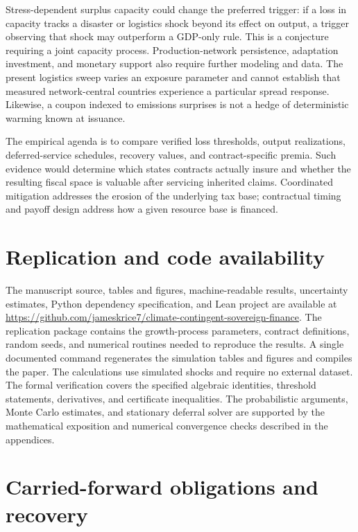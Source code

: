 \documentclass[11pt]{article}
\begin{document}
Stress-dependent surplus capacity could change the preferred trigger: if a loss in capacity tracks a disaster or logistics shock beyond its effect on output, a trigger observing that shock may outperform a GDP-only rule. This is a conjecture requiring a joint capacity process. Production-network persistence, adaptation investment, and monetary support also require further modeling and data. The present logistics sweep varies an exposure parameter and cannot establish that measured network-central countries experience a particular spread response. Likewise, a coupon indexed to emissions surprises is not a hedge of deterministic warming known at issuance.

The empirical agenda is to compare verified loss thresholds, output realizations, deferred-service schedules, recovery values, and contract-specific premia. Such evidence would determine which states contracts actually insure and whether the resulting fiscal space is valuable after servicing inherited claims. Coordinated mitigation addresses the erosion of the underlying tax base; contractual timing and payoff design address how a given resource base is financed.



\section*{Replication and code availability}
The manuscript source, tables and figures, machine-readable results, uncertainty estimates, Python dependency specification, and Lean project are available at \url{https://github.com/jameskrice7/climate-contingent-sovereign-finance}. The replication package contains the growth-process parameters, contract definitions, random seeds, and numerical routines needed to reproduce the results. A single documented command regenerates the simulation tables and figures and compiles the paper. The calculations use simulated shocks and require no external dataset. The formal verification covers the specified algebraic identities, threshold statements, derivatives, and certificate inequalities. The probabilistic arguments, Monte Carlo estimates, and stationary deferral solver are supported by the mathematical exposition and numerical convergence checks described in the appendices.

\appendix
\section{Carried-forward obligations and recovery}\label{app:deferral}
\end{document}
